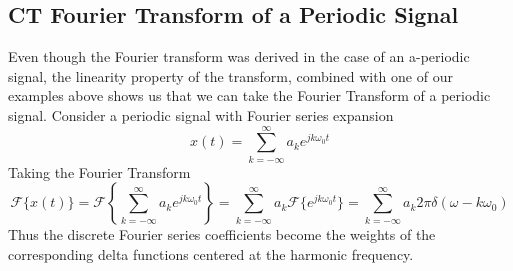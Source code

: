 \subsection{CT Fourier Transform of a Periodic Signal}

Even though the Fourier transform was derived in the case of an a-periodic signal, the linearity property of the transform, combined with one of our examples above shows us that we can take the Fourier Transform of a periodic signal. Consider a periodic signal with Fourier series expansion
\[
x(t) = \sum\limits_{k = -\infty}^{\infty} a_k e^{jk\omega_0 t}
\]
Taking the Fourier Transform
\[
\mathcal{F}\{x(t)\} = \mathcal{F}\left\{\sum\limits_{k = -\infty}^{\infty} a_k e^{jk\omega_0 t}\right\} = \sum\limits_{k = -\infty}^{\infty} a_k \mathcal{F}\{e^{jk\omega_0 t}\} = \sum\limits_{k = -\infty}^{\infty} a_k 2\pi \delta(\omega-k\omega_0) 
\]
Thus the discrete Fourier series coefficients become the weights of the corresponding delta functions centered at the harmonic frequency.


